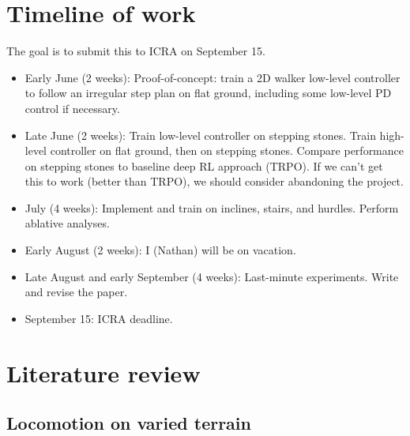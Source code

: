 \documentclass[a4paper]{article}
\begin{document}
\section{Timeline of work}

The goal is to submit this to ICRA on September 15.

\begin{itemize}
  \item Early June (2 weeks): Proof-of-concept: train a 2D walker low-level controller to follow an irregular step plan on flat ground, including some low-level PD control if necessary.
  \item Late June (2 weeks): Train low-level controller on stepping stones.
    Train high-level controller on flat ground, then on stepping stones.
    Compare performance on stepping stones to baseline deep RL approach (TRPO).
    If we can't get this to work (better than TRPO), we should consider abandoning the project.
  \item July (4 weeks): Implement and train on inclines, stairs, and hurdles.
    Perform ablative analyses.
  \item Early August (2 weeks): I (Nathan) will be on vacation.
  \item Late August and early September (4 weeks): Last-minute experiments.
    Write and revise the paper.
  \item September 15: ICRA deadline.
\end{itemize}

\section{Literature review}

\subsection*{Locomotion on varied terrain}
\end{document}
